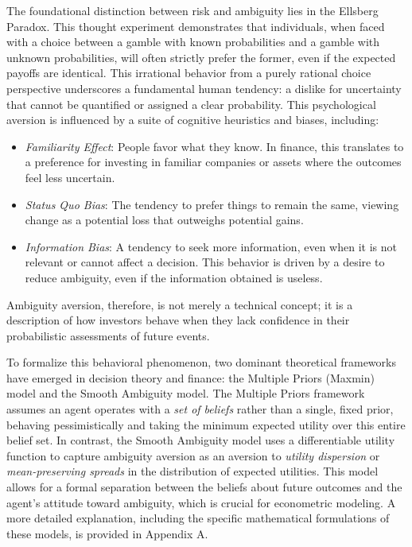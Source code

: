\documentclass[preprint,12pt,authoryear]{elsarticle}
\begin{document}
The foundational distinction between risk and ambiguity lies in the Ellsberg Paradox. This thought experiment demonstrates that individuals, when faced with a choice between a gamble with known probabilities and a gamble with unknown probabilities, will often strictly prefer the former, even if the expected payoffs are identical. This irrational behavior from a purely rational choice perspective underscores a fundamental human tendency: a dislike for uncertainty that cannot be quantified or assigned a clear probability. This psychological aversion is influenced by a suite of cognitive heuristics and biases, including: 

\begin{itemize}
    \item \textit{Familiarity Effect}: People favor what they know. In finance, this translates to a preference for investing in familiar companies or assets where the outcomes feel less uncertain. 
    \item \textit{Status Quo Bias}: The tendency to prefer things to remain the same, viewing change as a potential loss that outweighs potential gains.
    \item \textit{Information Bias}: A tendency to seek more information, even when it is not relevant or cannot affect a decision. This behavior is driven by a desire to reduce ambiguity, even if the information obtained is useless.
\end{itemize}

Ambiguity aversion, therefore, is not merely a technical concept; it is a description of how investors behave when they lack confidence in their probabilistic assessments of future events. 

To formalize this behavioral phenomenon, two dominant theoretical frameworks have emerged in decision theory and finance: the Multiple Priors (Maxmin) model and the Smooth Ambiguity model. The Multiple Priors framework assumes an agent operates with a \textit{set of beliefs} rather than a single, fixed prior, behaving pessimistically and taking the minimum expected utility over this entire belief set. In contrast, the Smooth Ambiguity model uses a differentiable utility function to capture ambiguity aversion as an aversion to \textit{utility dispersion} or \textit{mean-preserving spreads} in the distribution of expected utilities. This model allows for a formal separation between the beliefs about future outcomes and the agent's attitude toward ambiguity, which is crucial for econometric modeling. A more detailed explanation, including the specific mathematical formulations of these models, is provided in Appendix A.
\end{document}
